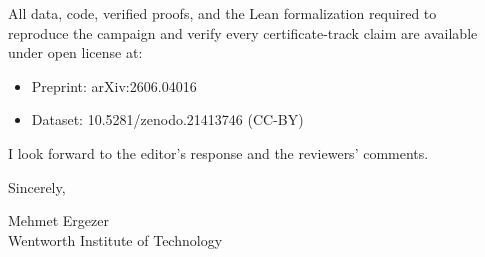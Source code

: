 \documentclass[
]{article}
\providecommand{\tightlist}{%
  \setlength{\itemsep}{0pt}\setlength{\parskip}{0pt}}
\begin{document}
All data, code, verified proofs, and the Lean formalization required
to\\
reproduce the campaign and verify every certificate-track claim are
available\\
under open license at:

\begin{itemize}
\tightlist
\item
  Preprint: arXiv:2606.04016
\item
  Dataset: 10.5281/zenodo.21413746 (CC-BY)
\end{itemize}

I look forward to the editor's response and the reviewers' comments.

Sincerely,

Mehmet Ergezer\\
Wentworth Institute of Technology
\end{document}
